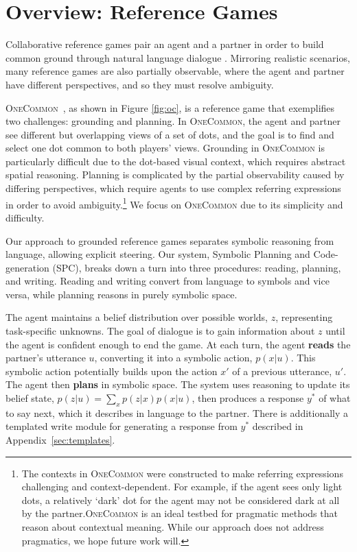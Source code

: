 \documentclass[11pt]{article}
\newcommand{\system}{SPC}
\begin{document}
\section{Overview: Reference Games}
Collaborative reference games
pair an agent and a partner in order to build common ground through natural language dialogue \citep{pb,pip,mf,onecommon}.
Mirroring realistic scenarios, many reference games are also partially observable,
where the agent and partner have different perspectives, and so they must resolve ambiguity.

\textsc{OneCommon}~\citep{onecommon}, as shown in Figure \ref{fig:oc}, is a reference game that exemplifies two challenges: grounding and planning.
In \textsc{OneCommon}, the agent and partner see different but overlapping views of a set of dots, and the goal is to find and select one dot common to both players' views.
Grounding in \textsc{OneCommon} is particularly difficult due to the dot-based visual context, which requires abstract spatial reasoning.
Planning is complicated by the partial observability caused by differing perspectives, which require agents to use complex referring expressions in order to avoid ambiguity.\footnote{The contexts in \textsc{OneCommon} were constructed to make referring expressions challenging and context-dependent. For example, if the agent sees only light dots, a relatively `dark' dot for the agent may not be considered dark at all by the partner.\textsc{OneCommon} is an ideal testbed for pragmatic methods that reason about contextual meaning. While our approach does not address pragmatics, we hope future work will.}
We focus on \textsc{OneCommon} due to its simplicity and difficulty.

Our approach to grounded reference games separates symbolic reasoning from language, allowing explicit steering.
Our system, Symbolic Planning and Code-generation (\system{}), breaks down a turn into three procedures: reading, planning, and writing.
Reading and writing convert from language to symbols and vice versa,
while planning reasons in purely symbolic space.

The agent maintains a belief distribution over possible worlds, $z$, representing task-specific unknowns.
The goal of dialogue is to gain information about $z$ until the agent is confident enough to end the game.
At each turn, the agent \textbf{reads} the partner's utterance $u$, converting it into a symbolic action, $p(x|u)$. This symbolic action potentially builds upon the action $x'$ of a previous utterance, $u'$.
The agent then \textbf{plans} in symbolic space.
The system uses reasoning to update its belief state, $p(z|u)=\sum_x p(z|x)p(x|u)$,
then produces a response $y^*$ of what to say next, which it describes in language to the partner. There is additionally a templated write module for generating a response from $y^*$ described in Appendix~\ref{sec:templates}.
\end{document}
